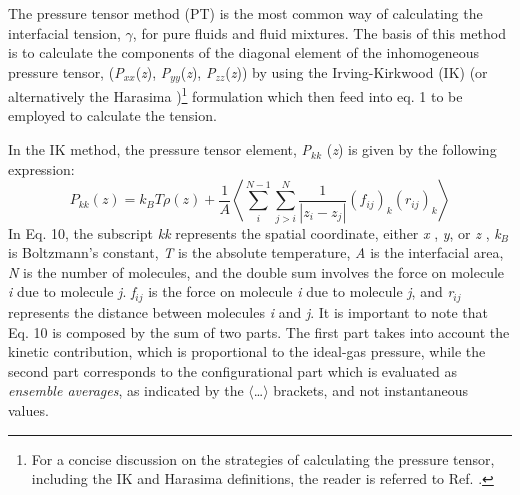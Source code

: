 \documentclass{scrbook}
\begin{document}
The pressure tensor method (PT) is the most common way of calculating the
interfacial tension, {${\gamma}$}, for pure fluids and fluid mixtures. The
basis of this method is to calculate the components of the diagonal element of
the inhomogeneous pressure tensor, (\textit{P}$_{xx}$(\textit{z}),
\textit{P}$_{yy}$(\textit{z}), \textit{P}$_{zz}$(\textit{z})) by using the
Irving-Kirkwood (IK) \citep{irving1950}
(or alternatively the Harasima \citep{harasima1957})\footnote{For
a concise discussion on the strategies of calculating the pressure tensor,
including the IK and Harasima definitions, the reader is referred to Ref. \citep{long2013}.
}
formulation which
then feed into eq. 1 to be employed to calculate the tension. 

In the IK method, the pressure tensor element, \textit{P}$_{kk}$ (\textit{z}) is given by the following expression:
\begin{equation}
P_{kk}\left(z\right)=k_{B}T\rho\left(z\right)+\frac{1}{A}\left\langle \sum_{{\scriptstyle i}}^{{\scriptstyle N-1}}\sum_{{\scriptstyle j>i}}^{N}\frac{1}{\left|z_{i}-z_{j}\right|}\left(f_{ij}\right)_{k}\left(r_{ij}\right)_{k}\right\rangle 
\end{equation}
In Eq. 10, the subscript \textit{kk} represents the spatial coordinate, either
\textit{x} , \textit{y}, or \textit{z} , \textit{k}$_{B}$ is Boltzmann's
constant, \textit{T} is the absolute temperature, \textit{A} is the interfacial
area, \textit{N} is the number of molecules, and the double sum involves the
force on molecule \textit{i} due to molecule \textit{j}. \textit{f}$_{ij}$ is
the force on molecule \textit{i} due to molecule \textit{j}, and
\textit{r}$_{ij}$ represents the distance between molecules \textit{i} and
\textit{j}. It is important to note that Eq. 10 is composed by the sum of two
parts. The first part takes into account the kinetic contribution, which is
proportional to the ideal-gas pressure, while the second part corresponds to
the configurational part which is evaluated as \textit{ensemble averages}, as
indicated by the ${\langle}${\ldots}${\rangle}$ brackets, and not instantaneous
values.
\end{document}
